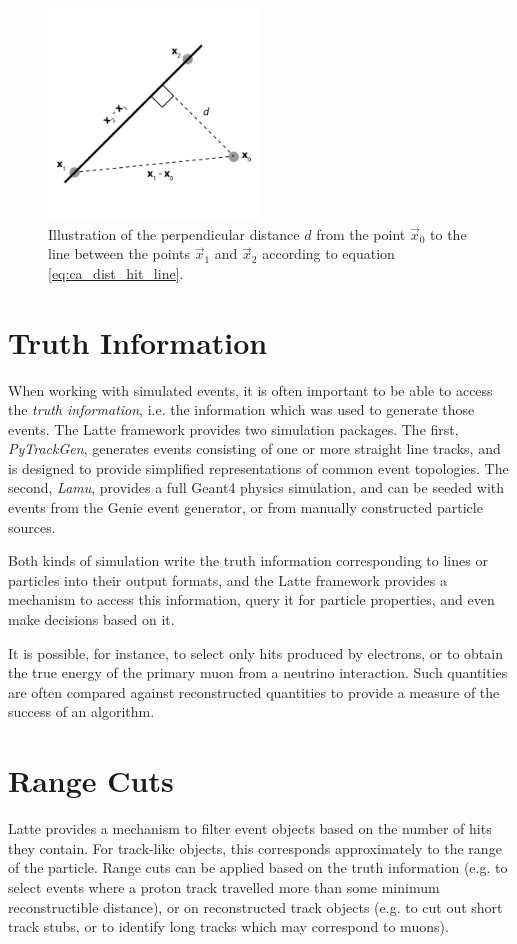 \begin{figure}
\centering
\includegraphics[width=0.5\textwidth]{chapters/cellularautomaton_images/PerpDist}
\caption[Perpendicular distance from a point to a line in 3D]{\label{fig:ca_perp_dist}Illustration of the perpendicular distance $d$ from the point $\vec{x}_0$ to the line between the points $\vec{x}_1$ and $\vec{x}_2$ according to equation \ref{eq:ca_dist_hit_line}.}
\end{figure}


\section{Truth Information}
When working with simulated events, it is often important to be able to access the \emph{truth information}, i.e. the information which was used to generate those events. The Latte framework provides two simulation packages. The first, \emph{PyTrackGen}, generates events consisting of one or more straight line tracks, and is designed to provide simplified representations of common event topologies. The second, \emph{Lamu}, provides a full Geant4 physics simulation, and can be seeded with events from the Genie event generator, or from manually constructed particle sources.

Both kinds of simulation write the truth information corresponding to lines or particles into their output formats, and the Latte framework provides a mechanism to access this information, query it for particle properties, and even make decisions based on it.

It is possible, for instance, to select only hits produced by electrons, or to obtain the true energy of the primary muon from a neutrino interaction. Such quantities are often compared against reconstructed quantities to provide a measure of the success of an algorithm.

\section{Range Cuts}
Latte provides a mechanism to filter event objects based on the number of hits they contain. For track-like objects, this corresponds approximately to the range of the particle. Range cuts can be applied based on the truth information (e.g. to select events where a proton track travelled more than some minimum reconstructible distance), or on reconstructed track objects (e.g. to cut out short track stubs, or to identify long tracks which may correspond to muons).

